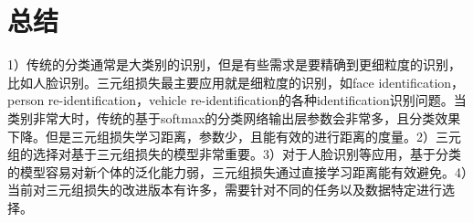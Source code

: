 \documentclass[a4paper]{article}
\begin{document}
    \section{总结}

    1）传统的分类通常是大类别的识别，但是有些需求是要精确到更细粒度的识别，比如人脸识别。三元组损失最主要应用就是细粒度的识别，如face identification，person re-identification，vehicle re-identification的各种identification识别问题。当类别非常大时，传统的基于softmax的分类网络输出层参数会非常多，且分类效果下降。但是三元组损失学习距离，参数少，且能有效的进行距离的度量。2）三元组的选择对基于三元组损失的模型非常重要。3）对于人脸识别等应用，基于分类的模型容易对新个体的泛化能力弱，三元组损失通过直接学习距离能有效避免。4）当前对三元组损失的改进版本有许多，需要针对不同的任务以及数据特定进行选择。

    
    
\end{document}
